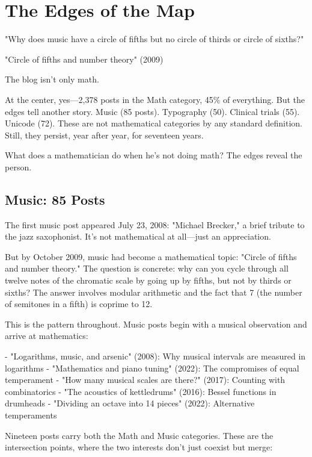 \chapter{The Edges of the Map}

\epigraph{"Why does music have a circle of fifths but no circle of thirds or circle of sixths?"}{"Circle of fifths and number theory" (2009)}

\bigskip

The blog isn't only math.

At the center, yes—2,378 posts in the Math category, 45\% of everything. But the edges tell another story. Music (85 posts). Typography (50). Clinical trials (55). Unicode (72). These are not mathematical categories by any standard definition. Still, they persist, year after year, for seventeen years.

What does a mathematician do when he's not doing math? The edges reveal the person.

\bigskip

\section*{Music: 85 Posts}

The first music post appeared July 23, 2008: "Michael Brecker," a brief tribute to the jazz saxophonist. It's not mathematical at all—just an appreciation.

But by October 2009, music had become a mathematical topic: "Circle of fifths and number theory." The question is concrete: why can you cycle through all twelve notes of the chromatic scale by going up by fifths, but not by thirds or sixths? The answer involves modular arithmetic and the fact that 7 (the number of semitones in a fifth) is coprime to 12.

This is the pattern throughout. Music posts begin with a musical observation and arrive at mathematics:

- "Logarithms, music, and arsenic" (2008): Why musical intervals are measured in logarithms
- "Mathematics and piano tuning" (2022): The compromises of equal temperament
- "How many musical scales are there?" (2017): Counting with combinatorics
- "The acoustics of kettledrums" (2016): Bessel functions in drumheads
- "Dividing an octave into 14 pieces" (2022): Alternative temperaments

Nineteen posts carry both the Math and Music categories. These are the intersection points, where the two interests don't just coexist but merge:

